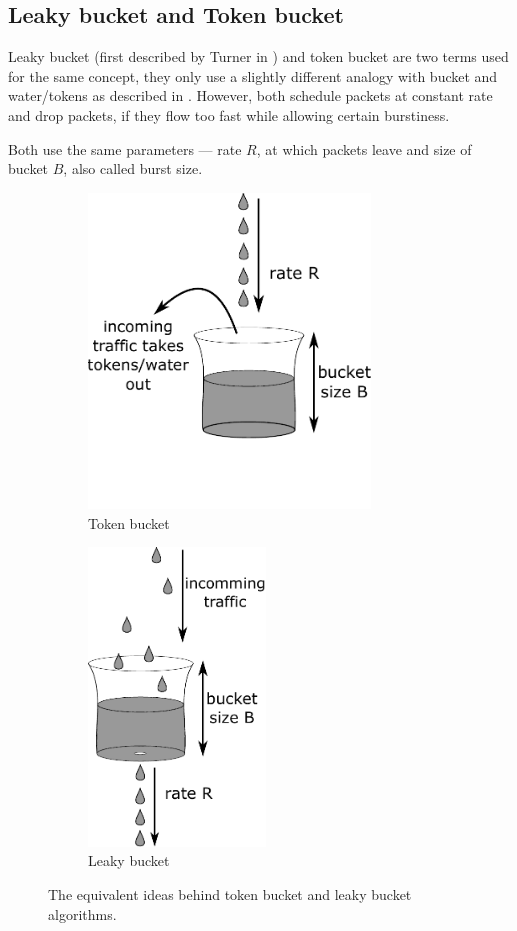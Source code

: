 \subsection{Leaky bucket and Token bucket}
\label{token_bucket}
Leaky bucket (first described by Turner in \cite{turner1986new}) and token bucket are two terms used for the same concept, they only use a slightly different analogy with bucket and water/tokens as described in \cite[Section 5.4.2]{Tanenbaum:2002:CN:572404}. However, both schedule packets at constant rate and drop packets, if they flow too fast while allowing certain burstiness.

Both use the same parameters --- rate $R$, at which packets leave and size of bucket $B$, also called burst size.

\begin{figure}
	\centering
	\begin{subfigure}{.6\linewidth}
		\centering
		\includegraphics[width=75mm]{drawings/token_bucket}
		\caption{Token bucket}
		\label{fig08:token}
	\end{subfigure}%
	\begin{subfigure}{.4\linewidth}
		\centering
		\includegraphics[width=47mm]{drawings/leaky_bucket}
		\caption{Leaky bucket}
		\label{fig08:leaky}
	\end{subfigure}
	\caption{The equivalent ideas behind token bucket and leaky bucket algorithms.}
	\label{fig08:token_leaky}
\end{figure}

